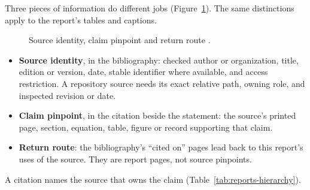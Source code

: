 Three pieces of information do different jobs (Figure~\ref{fig:reports-route}). The same
distinctions apply to the report's tables and captions.

\begin{figure}[H]
  \centering
  \caption{Source identity, claim pinpoint and return route \cite[Source traceability and
      corroboration; Bibliography and reader-verifiable pinpoints]{skill:report-production}.}
  \label{fig:reports-route}
\end{figure}

\begin{itemize}
  \item \textbf{Source identity}, in the bibliography: checked author or organization, title,
        edition or version, date, stable identifier where available, and access restriction. A
        repository source needs its exact relative path, owning role, and inspected revision or
        date.
  \item \textbf{Claim pinpoint}, in the citation beside the statement: the source's printed
        page, section, equation, table, figure or record supporting that claim.
  \item \textbf{Return route}: the bibliography's ``cited on'' pages lead back to this
        report's uses of the source. They are report pages, not source pinpoints.
\end{itemize}

A citation names the source that owns the claim (Table~\ref{tab:reports-hierarchy}).

